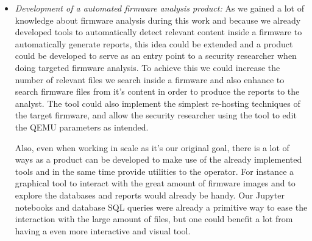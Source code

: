 \begin{itemize}
    \item \textit{Development of a automated firmware analysis product:} As we gained a lot of knowledge about firmware analysis during this work and because we already developed tools to automatically detect relevant content inside a firmware to automatically generate reports, this idea could be extended and a product could be developed to serve as an entry point to a security researcher when doing targeted firmware analysis. To achieve this we could increase the number of relevant files we search inside a firmware and also enhance to search firmware files from it's content in order to produce the reports to the analyst. The tool could also implement the simplest re-hosting techniques of the target firmware, and allow the security researcher using the tool to edit the QEMU parameters as intended.
    
    Also, even when working in scale as it's our original goal, there is a lot of ways as a product can be developed to make use of the already implemented tools and in the same time provide utilities to the operator. For instance a graphical tool to interact with the great amount of firmware images and to explore the databases and reports would already be handy. Our Jupyter notebooks and database SQL queries were already a primitive way to ease the interaction with the large amount of files, but one could benefit a lot from having a even more interactive and visual tool.
\end{itemize}